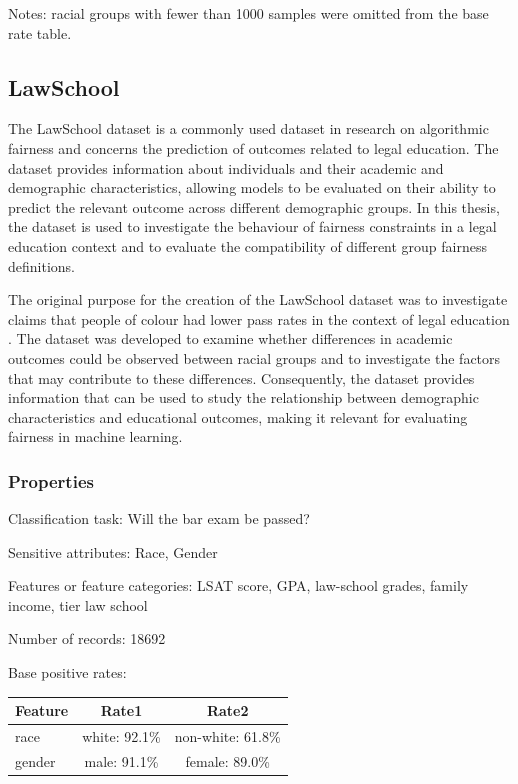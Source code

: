 Notes: racial groups with fewer than 1000 samples were omitted from the base rate table.

\subsection{LawSchool}
The LawSchool dataset is a commonly used dataset in research on algorithmic fairness and concerns the prediction of outcomes related to legal education. The dataset provides information about individuals and their academic and demographic characteristics, allowing models to be evaluated on their ability to predict the relevant outcome across different demographic groups. In this thesis, the dataset is used to investigate the behaviour of fairness constraints in a legal education context and to evaluate the compatibility of different group fairness definitions.

The original purpose for the creation of the LawSchool dataset was to investigate claims that people of colour had lower pass rates in the context of legal education \cite{lawschool}. The dataset was developed to examine whether differences in academic outcomes could be observed between racial groups and to investigate the factors that may contribute to these differences. Consequently, the dataset provides information that can be used to study the relationship between demographic characteristics and educational outcomes, making it relevant for evaluating fairness in machine learning.

\subsubsection{Properties}
Classification task: Will the bar exam be passed?

Sensitive attributes: Race, Gender

Features or feature categories: LSAT score, GPA, law-school grades, family income, tier law school

Number of records: 18692

Base positive rates:
\begin{table}[htbp]{}
    \begin{tabular}{l|cc}
        \hline
        Feature & Rate1 & Rate2\\
        \hline
        race & white: 92.1\% & non-white: 61.8\%\\
        gender & male: 91.1\% & female: 89.0\%\\
         \hline
    \end{tabular}
\end{table}

